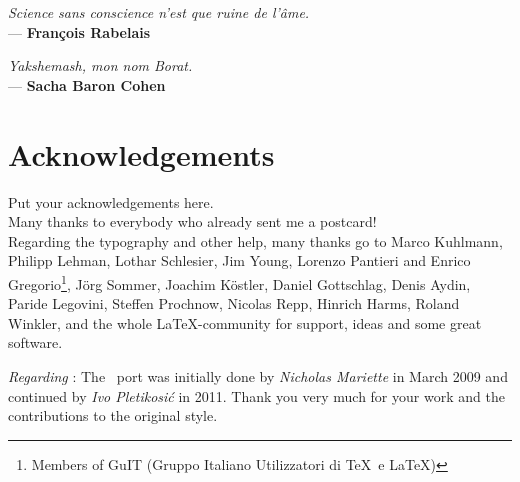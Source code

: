 

\begin{flushright}{\slshape    
Science sans conscience n'est que ruine de l'âme.} \\ \medskip
--- \textbf{François Rabelais}
\end{flushright}


\begin{flushright}{\slshape    
Yakshemash, mon nom Borat.} \\ \medskip
--- \textbf{Sacha Baron Cohen}
\end{flushright}

\bigskip


\begingroup

\let\clearpage\relax
\let\cleardoublepage\relax
\let\cleardoublepage\relax

\chapter*{Acknowledgements}

\noindent Put your acknowledgements here.\\

\noindent Many thanks to everybody who already sent me a postcard!\\

\noindent Regarding the typography and other help, many thanks go to Marco Kuhlmann, Philipp Lehman, Lothar Schlesier, Jim Young, Lorenzo Pantieri and Enrico Gregorio\footnote{Members of GuIT (Gruppo Italiano Utilizzatori di \TeX\ e \LaTeX )}, J\"org Sommer, Joachim K\"ostler, Daniel Gottschlag, Denis Aydin, Paride Legovini, Steffen Prochnow, Nicolas Repp, Hinrich Harms, Roland Winkler, and the whole \LaTeX-community for support, ideas and some great software.

\bigskip

\noindent\emph{Regarding \mLyX}: The \mLyX\ port was initially done by
\emph{Nicholas Mariette} in March 2009 and continued by
\emph{Ivo Pletikosi\'c} in 2011. Thank you very much for your work and the contributions to the original style.

\endgroup